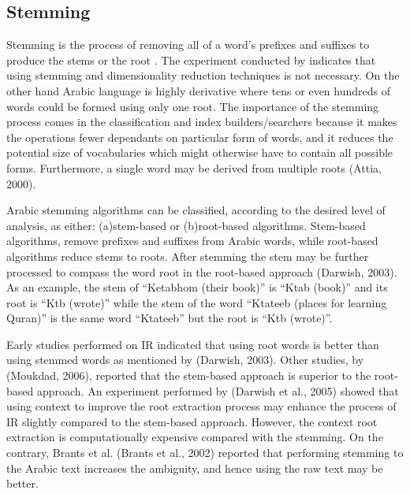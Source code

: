\subsection{Stemming}
Stemming is the process of removing all of a word's prefixes and suffixes to produce the stems or the root \citep{pre_3}.
The experiment conducted by \citep{pre_10} indicates that using stemming and dimensionality reduction techniques is not necessary. On the other hand Arabic language is highly derivative where tens or even hundreds of words could be
formed using only one root. The importance of the stemming process comes in the classification and index builders/searchers because it makes the operations fewer dependants on particular form of words, and it reduces the potential size of vocabularies which might otherwise have to contain all possible forms.
Furthermore, a single word may be derived from multiple roots (Attia, 2000). 

Arabic stemming algorithms can be classified, according to the desired level of analysis, as either: 
(a)stem-based or (b)root-based algorithms. Stem-based algorithms, remove prefixes and suffixes from Arabic words, while root-based algorithms reduce stems to roots. After stemming the stem may be further processed to compass the word root in the root-based approach (Darwish, 2003). 
As an example, the stem of “Ketabhom (their book)” is “Ktab (book)” and its root is “Ktb (wrote)” while the stem of the word “Ktateeb
(places for learning Quran)” is the same word “Ktateeb” but the root is  “Ktb (wrote)”.

Early studies performed on IR indicated that using root words is better than using stemmed words as mentioned by (Darwish, 2003). Other studies, by \citep{pre_11} (Moukdad, 2006), reported that the stem-based approach is superior to the root-based approach. An experiment performed by (Darwish et al., 2005) showed that using context to improve the root extraction process may enhance the process of IR slightly compared to the stem-based approach. However, the context root extraction is computationally expensive compared with the stemming. On the contrary, Brants et al. (Brants et al., 2002) reported that performing stemming to the Arabic text increases the ambiguity, and hence using the raw text may be better.



